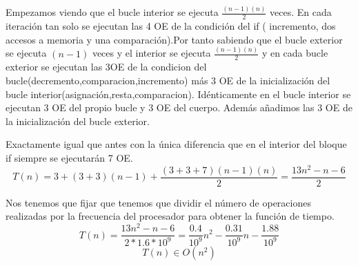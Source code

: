 \documentclass{article}
\begin{document}
Empezamos viendo que el bucle interior se ejecuta $\frac{(n-1)(n)}{2}$ veces.
En cada iteraci\'on tan solo se ejecutan las 4 OE de la condici\'on del if ( incremento, dos accesos a memoria y una comparaci\'on).Por tanto sabiendo que el bucle exterior se ejecuta $(n-1)$ veces y el interior se ejecuta $\frac{(n-1)(n)}{2}$ y en cada bucle exterior se ejecutan las 3OE de la condicion del bucle(decremento,comparacion,incremento) m\'as 3 OE de la inicializaci\'on del bucle interior(asignaci\'on,resta,comparacion). Id\'enticamente en el bucle interior se ejecutan 3 OE del propio bucle y 3 OE del cuerpo. Adem\'as añadimos las 3 OE de la inicializaci\'on del bucle exterior.

			Exactamente igual que antes con la \'unica diferencia que en el interior del bloque if siempre se ejecutar\'an 7 OE.
		\begin{equation}
			T(n) = 3 + (3+3)(n-1) + \frac{(3+3+7)(n-1)(n)}{2} = \frac{13n^2 -n -6}{2}
		\end{equation}

	Nos tenemos que fijar que tenemos que dividir el n\'umero de operaciones realizadas por la frecuencia del procesador para obtener la funci\'on de tiempo.
		\begin{equation}
			T(n) = \frac{13n^2 -n -6}{2*1.6*10^9} = \frac{0.4}{10^9}n^2 - \frac{0.31}{10^9}n - \frac{1.88}{10^9} 
		\end{equation}
		\begin{equation}
						T(n) \in O(n^2)
		\end{equation}
\end{document}
